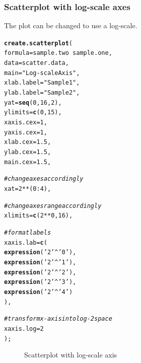 \documentclass[letterpaper]{report}\usepackage[]{graphicx}\usepackage[]{color}
\makeatletter
\newcommand{\hlnum}[1]{\textcolor[rgb]{0.686,0.059,0.569}{#1}}%
\newcommand{\hlstr}[1]{\textcolor[rgb]{0.192,0.494,0.8}{#1}}%
\newcommand{\hlcom}[1]{\textcolor[rgb]{0.678,0.584,0.686}{\textit{#1}}}%
\newcommand{\hlopt}[1]{\textcolor[rgb]{0,0,0}{#1}}%
\newcommand{\hlstd}[1]{\textcolor[rgb]{0.345,0.345,0.345}{#1}}%
\newcommand{\hlkwc}[1]{\textcolor[rgb]{0.333,0.667,0.333}{#1}}%
\newcommand{\hlkwd}[1]{\textcolor[rgb]{0.737,0.353,0.396}{\textbf{#1}}}%
\newenvironment{kframe}{%
 \def\at@end@of@kframe{}%
 \ifinner\ifhmode%
  \def\at@end@of@kframe{\end{minipage}}%
  \begin{minipage}{\columnwidth}%
 \fi\fi%
 \def\FrameCommand##1{\hskip\@totalleftmargin \hskip-\fboxsep
 \colorbox{shadecolor}{##1}\hskip-\fboxsep
     \hskip-\linewidth \hskip-\@totalleftmargin \hskip\columnwidth}%
 \MakeFramed {\advance\hsize-\width
   \@totalleftmargin\z@ \linewidth\hsize
   \@setminipage}}%
 {\par\unskip\endMakeFramed%
 \at@end@of@kframe}
\newenvironment{knitrout}{}{} %
\makeatother
\begin{document}
\subsubsection{Scatterplot with log-scale axes}
The plot can be changed to use a log-scale. 
\begin{knitrout}
\color{fgcolor}\begin{kframe}
\begin{alltt}
\hlkwd{create.scatterplot}\hlstd{(}
    \hlkwc{formula} \hlstd{= sample.two} \hlopt{~} \hlstd{sample.one,}
    \hlkwc{data} \hlstd{= scatter.data,}
    \hlkwc{main} \hlstd{=} \hlstr{"Log-scale Axis"}\hlstd{,}
    \hlkwc{xlab.label} \hlstd{=} \hlstr{"Sample 1"}\hlstd{,}
    \hlkwc{ylab.label} \hlstd{=} \hlstr{"Sample 2"}\hlstd{,}
    \hlkwc{yat} \hlstd{=} \hlkwd{seq}\hlstd{(}\hlnum{0}\hlstd{,} \hlnum{16}\hlstd{,} \hlnum{2}\hlstd{),}
    \hlkwc{ylimits} \hlstd{=} \hlkwd{c}\hlstd{(}\hlnum{0}\hlstd{,} \hlnum{15}\hlstd{),}
    \hlkwc{xaxis.cex} \hlstd{=} \hlnum{1}\hlstd{,}
    \hlkwc{yaxis.cex} \hlstd{=} \hlnum{1}\hlstd{,}
    \hlkwc{xlab.cex} \hlstd{=} \hlnum{1.5}\hlstd{,}
    \hlkwc{ylab.cex} \hlstd{=} \hlnum{1.5}\hlstd{,}
    \hlkwc{main.cex} \hlstd{=} \hlnum{1.5}\hlstd{,}

    \hlcom{# change axes accordingly }
    \hlkwc{xat} \hlstd{=} \hlnum{2} \hlopt{**} \hlstd{(}\hlnum{0}\hlopt{:}\hlnum{4}\hlstd{),}

    \hlcom{# change axes range accordingly}
    \hlkwc{xlimits} \hlstd{=} \hlkwd{c}\hlstd{(}\hlnum{2} \hlopt{**} \hlnum{0}\hlstd{,}\hlnum{16}\hlstd{),}

    \hlcom{# format labels}
    \hlkwc{xaxis.lab} \hlstd{=} \hlkwd{c}\hlstd{(}
        \hlkwd{expression}\hlstd{(}\hlstr{'2'}\hlopt{^}\hlstr{'0'}\hlstd{),}
        \hlkwd{expression}\hlstd{(}\hlstr{'2'}\hlopt{^}\hlstr{'1'}\hlstd{),}
        \hlkwd{expression}\hlstd{(}\hlstr{'2'}\hlopt{^}\hlstr{'2'}\hlstd{),}
        \hlkwd{expression}\hlstd{(}\hlstr{'2'}\hlopt{^}\hlstr{'3'}\hlstd{),}
        \hlkwd{expression}\hlstd{(}\hlstr{'2'}\hlopt{^}\hlstr{'4'}\hlstd{)}
        \hlstd{),}

    \hlcom{# transform x-axis into log-2 space}
    \hlkwc{xaxis.log} \hlstd{=} \hlnum{2}
    \hlstd{);}
\end{alltt}
\end{kframe}\begin{figure}

{\centering {} 

}

\caption[Scatterplot with log-scale axis]{Scatterplot with log-scale axis\label{fig:scatter3}}
\end{figure}


\end{knitrout}
\end{document}
